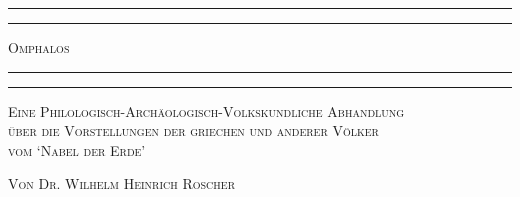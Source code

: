 \documentclass[a4paper, 11pt, oneside]{article}
\begin{document}
\bfseries
\pagestyle{plain} %

\renewcommand\thefootnote{{\bfseries\color{BrickRed}{\arabic{footnote}}}}
\let\oldfootnote\footnote
    \renewcommand{\footnote}[1]{\oldfootnote{{\normalsize\bfseries\color{BrickRed}#1}}}
\begin{titlepage} %
	\centering %

	
	\rule{\textwidth}{1.6pt}\vspace*{-\baselineskip}\vspace*{2pt} %
	\rule{\textwidth}{0.4pt} %
	
	\vspace{1\baselineskip} %
	
	{\scshape\Huge Omphalos}
	
	\vspace{1\baselineskip} %

	\rule{\textwidth}{0.4pt}\vspace*{-\baselineskip}\vspace{3.2pt} %
	\rule{\textwidth}{1.6pt} %
	
	\vspace{1\baselineskip} %
	
	
        {\scshape Eine Philologisch-Archäologisch-Volkskundliche Abhandlung \\über die Vorstellungen der griechen und anderer Völker \\vom `Nabel der Erde'} %
	
	\vspace*{1\baselineskip} %

        {\scshape Von \Large Dr. Wilhelm Heinrich Roscher}

	\vspace*{1\baselineskip} %


\end{titlepage}
\end{document}
